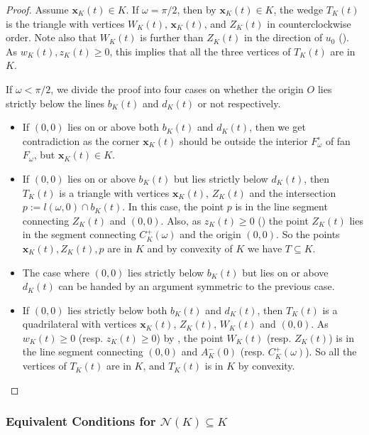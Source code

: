 \begin{proof}
Assume \(\mathbf{x}_K(t) \in K\). If \(\omega = \pi/2\), then by \(\mathbf{x}_K(t) \in K\), the wedge \(T_K(t)\) is the triangle with vertices \(W_K(t)\), \(\mathbf{x}_K(t)\), and \(Z_K(t)\) in counterclockwise order. Note also that \(W_K(t)\) is further than \(Z_K(t)\) in the direction of \(u_0\) (). As \(w_K(t), z_K(t) \geq 0\), this implies that all the three vertices of \(T_K(t)\) are in \(K\).

If \(\omega < \pi/2\), we divide the proof into four cases on whether the origin \(O\) lies strictly below the lines \(b_K(t)\) and \(d_K(t)\) or not respectively.

\begin{itemize}
\tightlist
\item
  If \((0, 0)\) lies on or above both \(b_K(t)\) and \(d_K(t)\), then we get contradiction as the corner \(\mathbf{x}_K(t)\) should be outside the interior \(F_\omega^\circ\) of fan \(F_\omega\), but \(\mathbf{x}_K(t) \in K\).
\item
  If \((0, 0)\) lies on or above \(b_K(t)\) but lies strictly below \(d_K(t)\), then \(T_K(t)\) is a triangle with vertices \(\mathbf{x}_K(t)\), \(Z_K(t)\) and the intersection \(p := l(\omega, 0) \cap b_K(t)\). In this case, the point \(p\) is in the line segment connecting \(Z_K(t)\) and \((0, 0)\). Also, as \(z_K(t) \geq 0\) () the point \(Z_K(t)\) lies in the segment connecting \(C^+_K(\omega)\) and the origin \((0, 0)\). So the points \(\mathbf{x}_K(t), Z_K(t), p\) are in \(K\) and by convexity of \(K\) we have \(T \subseteq K\).
\item
  The case where \((0, 0)\) lies strictly below \(b_K(t)\) but lies on or above \(d_K(t)\) can be handed by an argument symmetric to the previous case.
\item
  If \((0, 0)\) lies strictly below both \(b_K(t)\) and \(d_K(t)\), then \(T_K(t)\) is a quadrilateral with vertices \(\mathbf{x}_K(t)\), \(Z_K(t)\), \(W_K(t)\) and \((0, 0)\). As \(w_K(t) \geq 0\) (resp. \(z_K(t) \geq 0\)) by , the point \(W_K(t)\) (resp. \(Z_K(t)\)) is in the line segment connecting \((0, 0)\) and \(A^-_K(0)\) (resp. \(C^+_K(\omega)\)). So all the vertices of \(T_K(t)\) are in \(K\), and \(T_K(t)\) is in \(K\) by convexity.
\end{itemize}

\end{proof}

\subsubsection{\texorpdfstring{Equivalent Conditions for \(\mathcal{N}(K) \subseteq K\)}{Equivalent Conditions for \textbackslash mathcal\{N\}(K) \textbackslash subseteq K}}

